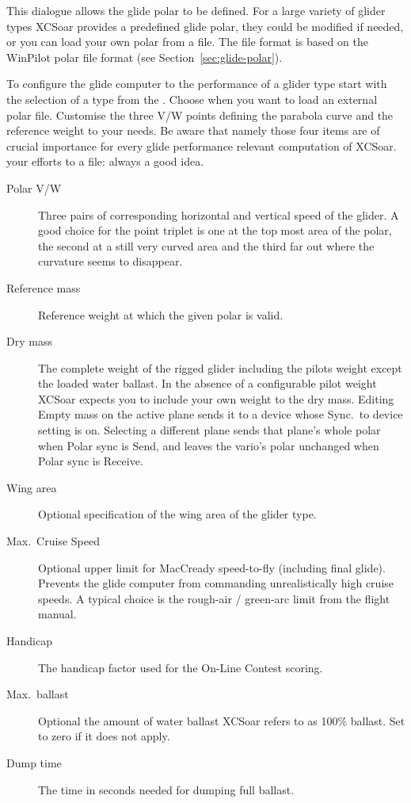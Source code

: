This dialogue allows the glide polar to be defined. For a large variety of glider
types XCSoar provides a predefined glide polar, they could be modified if 
needed, or you can load your own polar from a file. 
The file format is based on the WinPilot polar file format (see Section~\ref{sec:glide-polar}).

\label{conf:polar} To configure the glide computer to the performance of a glider 
type start with the selection of a type from the . 
Choose  when you want to load an external polar file.
Customise the three V/W points defining the parabola curve and the reference
weight to your needs. 
\tip Be aware that namely those four items are of crucial importance 
for every glide performance relevant computation of XCSoar.   
 your efforts to a file: always a good idea.

\begin{description}
\item[Polar V/W]  Three pairs of corresponding horizontal and vertical speed of the glider. 
  A good choice for the point triplet is one at the top most area of the polar, the second at a 
  still very curved area and the third far out where the curvature seems to disappear.
\item[Reference mass]  Reference weight at which the given polar is valid.
\item[Dry mass]  The complete weight of the rigged glider including the pilots weight except the 
  loaded water ballast. 
  In the absence of a configurable pilot weight XCSoar expects you to include your own weight
  to the dry mass.
  Editing Empty mass on the active plane sends it to a device whose
  Sync.\ to device setting is on.
  Selecting a different plane sends that plane's whole polar when
  Polar sync is Send, and leaves the vario's polar unchanged when
  Polar sync is Receive.
\item[Wing area]  Optional specification of the wing area of the glider type.
\item[Max.\ Cruise Speed] Optional upper limit for MacCready speed-to-fly
  (including final glide).  Prevents the glide computer from commanding
  unrealistically high cruise speeds.  A typical choice is the rough-air
  / green-arc limit from the flight manual.
\item[Handicap]  The handicap factor used for the On-Line Contest scoring.
\item[Max.\ ballast]  Optional the amount of water ballast XCSoar refers to as 100\% ballast.
  Set to zero if it does not apply.
\item[Dump time]  The time in seconds needed for dumping full ballast.
\end{description}


